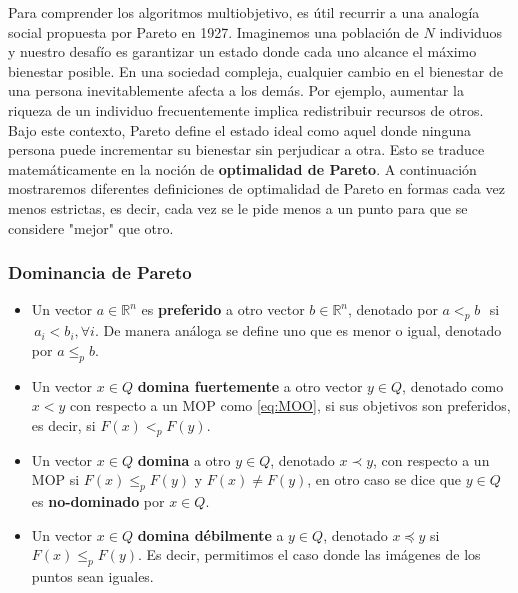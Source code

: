 Para comprender los algoritmos multiobjetivo, es útil recurrir a una analogía social propuesta por Pareto en 1927.
Imaginemos una población de $N$ individuos y nuestro desafío es garantizar un estado donde cada uno alcance el máximo bienestar posible. En una sociedad compleja, cualquier cambio en el bienestar de una persona inevitablemente afecta a los demás. Por ejemplo, aumentar la riqueza de un individuo frecuentemente implica redistribuir recursos de otros. Bajo este contexto, Pareto define el estado ideal como aquel donde ninguna persona puede incrementar su bienestar sin perjudicar a otra. Esto se traduce matemáticamente en la noción de \textbf{optimalidad de Pareto}. A continuación mostraremos diferentes definiciones de optimalidad de Pareto en formas cada vez menos estrictas, es decir, cada vez se le pide menos a un punto para que se considere "mejor" que otro. 


\subsubsection*{Dominancia de Pareto}

\begin{itemize}
    \item Un vector $a\in \mathbb{R}^n$ es \textbf{preferido} a otro vector $b\in \mathbb{R}^n$, denotado por $a<_p b \, \, $ si $\, a_i <b_i, \forall i$. De manera análoga se define uno que es menor o igual, denotado por $a\leq_p b$.
    \item Un vector $x\in Q$ \textbf{domina fuertemente} a otro vector $y\in Q$, denotado como $x < y$ con respecto a un MOP como \eqref{eq:MOO}, si sus objetivos son preferidos, es decir, si $F(x) <_p F(y)$.
    \item Un vector $x\in Q$ \textbf{domina} a otro $y\in Q$, denotado $x\prec y$, con respecto a un MOP si $F(x) \leq_p F(y)$ y $F(x)\neq F(y)$, en otro caso se dice que $y\in Q$  es \textbf{no-dominado} por $x\in Q$.
    \item Un vector $x\in Q$ \textbf{domina débilmente} a $y\in Q$, denotado $x\preceq y$ si $F(x)\leq_p F(y)$. Es decir, permitimos el caso donde las imágenes de los puntos sean iguales. 
\end{itemize}

